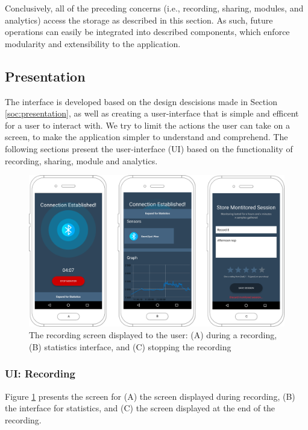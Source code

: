 Conclusively, all of the preceding concerns (i.e., recording, sharing, modules, and analytics) access the storage as described in this section. As such, future operations can easily be integrated into described components, which enforce modularity and extensibility to the application.

\subsection{Presentation}\label{ioc:presentation}
The interface is developed based on the design descisions made in Section \ref{soc:presentation}, as well as creating a user-interface that is simple and efficent for a user to interact with. We try to limit the actions the user can take on a screen, to make the application simpler to understand and comprehend. The following sections present the user-interface (UI) based on the functionality of recording, sharing, module and analytics. 

\begin{figure}[!h]
    \centering
    \includegraphics[scale=0.26]{images/Recording_img.pdf}
    \caption{The recording screen displayed to the user: (A) during a recording, (B) statistics interface, and (C) stopping the recording}
    \label{fig:screen_recording}
\end{figure}

\subsubsection{UI: Recording}

Figure \ref{fig:screen_recording} presents the screen for (A) the screen displayed during recording, (B) the interface for statistics, and (C) the screen displayed at the end of the recording. 


